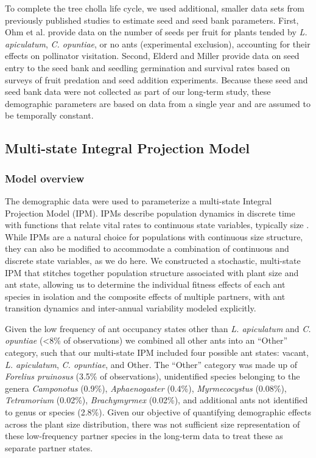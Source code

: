 \documentclass[11pt]{article}
\begin{document}
{To complete the tree cholla life cycle, we used additional, smaller data sets from previously published studies to estimate seed and seed bank parameters. 
First, Ohm et al. \citeyear{Ohm2014} provide data on the number of seeds per fruit for plants tended by \textit{L. apiculatum}, \textit{C. opuntiae}, or no ants (experimental exclusion), accounting for their effects on pollinator visitation. 
Second, Elderd and Miller \citeyear{elderd2016quantifying} provide data on seed entry to the seed bank and seedling germination and survival rates based on surveys of fruit predation and seed addition experiments. 
Because these seed and seed bank data were not collected as part of our long-term study, these demographic parameters are based on data from a single year and are assumed to be temporally constant. }

\subsection*{Multi-state Integral Projection Model}
\subsubsection*{Model overview}
The demographic data were used to parameterize a multi-state Integral Projection Model (IPM).
IPMs describe population dynamics in discrete time with functions that relate vital rates to continuous state variables, typically size \citep{ellnerbook}. 
While IPMs are a natural choice for populations with continuous size structure, they can also be modified to accommodate a combination of continuous and discrete state variables, as we do here. 
We constructed a stochastic, multi-state IPM that stitches together population structure associated with plant size and ant state, allowing us to determine the individual fitness effects of each ant species in isolation and the composite effects of multiple partners, with ant transition dynamics and inter-annual variability modeled explicitly. 

Given the low frequency of ant occupancy states other than \textit{L. apiculatum} and \textit{C. opuntiae} (\textless8\% of observations) we combined all other ants into an ``Other'' category, such that our multi-state IPM included four possible ant states: vacant, \textit{L. apiculatum}, \textit{C. opuntiae}, and Other. 
The ``Other'' category was made up of \textit{Forelius pruinosus} (3.5\% of observations), unidentified species belonging to the genera \textit{Camponotus} (0.9\%), \textit{Aphaenogaster} (0.4\%), \textit{Myrmecocystus} (0.08\%), \textit{Tetramorium} (0.02\%), \textit{Brachymyrmex} (0.02\%), and additional ants not identified to genus or species (2.8\%). 
Given our objective of quantifying demographic effects across the plant size distribution, there was not sufficient size representation of these low-frequency partner species in the long-term data to treat these as separate partner states.  
\end{document}
